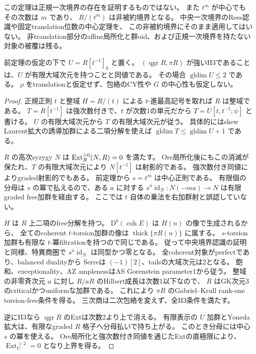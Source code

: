 この定理は正規一次境界の存在を証明するものではない。
また $t^m$ が中心でもその次数は $m$ であり、
$R/(t^m)$ は非被約境界となる。
中央一次境界のRees認識や固定translation位数の中心定理を、
この非被約境界にそのまま適用してはいない。
非translation部分のaffine局所化と群oid、および正規一次境界を持たない対象の被覆は残る。

\begin{theorem}[正規楕円境界を持つ全正規三次商のaffine認識]
\label{thm:normal-elliptic-affine-recognition}
前定理の仮定の下で $U=R[t^{-1}]_0$ と置く。
$(\operatorname{qgr}R,\pi R)$ が強いH3であることは、$U$ が有限大域次元を持つことと同値である。
その場合 $\operatorname{gldim}U\le2$ である。
$\rho$ をtranslationと仮定せず、包絡のCY性や $G$ の中心性も仮定しない。
\end{theorem}
\begin{proof}
正規正則 $t$ と整域 $H=R/(t)$ による $t$-進最高記号を取れば $R$ は整域である。
$T=R[t^{-1}]$ は強次数付きで、$t$ が次数1の単元だから
$T=U[t,t^{-1};\psi]$ と書ける。
$U$ の有限大域次元から $T$ の有限大域次元が従う。
具体的にはskew Laurent拡大の誘導加群による二項分解を使えば
$\operatorname{gldim}T\le\operatorname{gldim}U+1$ である。

$R$ の高次syzygy $N$ は $\operatorname{Ext}_R^{>0}(N,R)=0$ を満たす。
Ore局所化後にもこの消滅が保たれ、$T$ の有限大域次元により $N[t^{-1}]$ は射影的である。
強次数付き同値によりgraded射影的でもある。
前定理から $s=t^m$ は中心正則である。
有限個の分母は $s$ の冪で払えるので、ある $a$ に対する
$s^a\operatorname{id}_N:N(-ma)\to N$ は有限graded free加群を経由する。
ここでは $t$ 自体の乗法を右加群射と誤認していない。

$H$ は $R$ 上二項のfree分解を持つ。
$\mathrm D^b(\operatorname{coh}E)$ は $H(n)$ の像で生成されるから、
全てのcoherent $t$-torsion加群の像は $\operatorname{thick}\{\pi R(n)\}$ に属する。
$s$-torsion加群も有限な $t$-冪filtrationを持つので同じである。
従って中央境界認識の証明と同様、特異商圏で
$s^a\operatorname{id}_N$ は同型かつ零となる。
全coherent対象がperfectであり、balanced dualityから
Serreは $(-1)[2]$、tailsの大域次元は2となる。
飽和、exceptionality、AZ amplenessはAS Gorenstein parameter1から従う。
整域の非零斉次元 $a$ に対し $R/aR$ のHilbert成長は次数1以下なので、
$R$ はGK次元3のcriticalかつuniformな加群である。
これにより $\pi R$ のGabriel--Krull rank-one torsion-free条件を得る。
三次商は二次包絡を変えず、全H3条件を満たす。

逆にH3なら $\operatorname{qgr}R$ のExtは次数2より上で消える。
有限表示の $U$ 加群とYoneda拡大は、有限なgraded $R$ 格子へ分母払いで持ち上がる。
このとき分母には中心 $s$ の冪を使える。
Ore局所化と強次数付き同値を通じたExtの直極限により、
$\operatorname{Ext}_U^{>2}=0$ となり上界を得る。
\end{proof}

